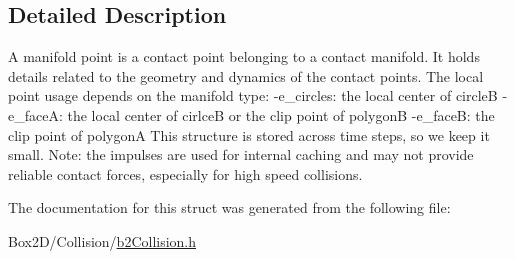 \subsection{Detailed Description}
A manifold point is a contact point belonging to a contact manifold. It holds details related to the geometry and dynamics of the contact points. The local point usage depends on the manifold type\+: -\/e\+\_\+circles\+: the local center of circleB -\/e\+\_\+faceA\+: the local center of cirlceB or the clip point of polygonB -\/e\+\_\+faceB\+: the clip point of polygonA This structure is stored across time steps, so we keep it small. Note\+: the impulses are used for internal caching and may not provide reliable contact forces, especially for high speed collisions. 

The documentation for this struct was generated from the following file\+:\begin{DoxyCompactItemize}
\item 
Box2\+D/\+Collision/\hyperlink{b2_collision_8h}{b2\+Collision.\+h}\end{DoxyCompactItemize}
